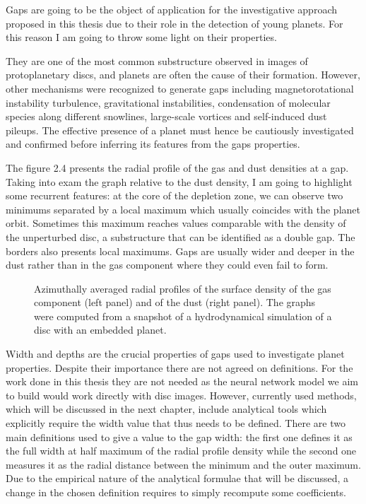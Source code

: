 \documentclass[a4paper,10pt]{report}
\begin{document}
Gaps are going to be the object of application for the investigative approach proposed in this thesis due
to their role in the detection of young planets.
For this reason I am going to throw some light on their properties.

They are one of the most common substructure observed in images of protoplanetary discs, and
planets are often the cause of their formation. However, other mechanisms were recognized to generate gaps
including magnetorotational instability turbulence, gravitational instabilities, condensation of molecular species along different snowlines,
large-scale vortices and self-induced dust pileups. The effective presence of a planet must hence be cautiously investigated and confirmed 
before inferring its features from the gaps properties. 

The figure 2.4 presents the radial profile of the gas and dust densities at a gap. Taking into exam 
the graph relative to the dust density, I am going to highlight some recurrent features:
at the core of the depletion zone, we can observe two minimums separated by a local maximum which usually coincides with the planet orbit.
Sometimes this maximum reaches values comparable with the density of the unperturbed disc, a substructure that can be identified as a double gap. 
The borders also presents local maximums. Gaps are usually wider and deeper in the dust rather than in the gas component where they could even
fail to form.

\begin{figure}
    \begin{center}
        
    \end{center}
    \caption{Azimuthally averaged radial profiles of the surface density of the gas component (left panel)
    and of the dust (right panel). The graphs were computed from a snapshot of a hydrodynamical
    simulation of a disc with an embedded planet.}
\end{figure}

Width and depths are the crucial properties of gaps used to investigate planet properties. Despite their importance there are not agreed on definitions.
For the work done in this thesis they are not needed as the neural network model we aim to build would work directly with disc images.
However, currently used methods, which will be discussed in the next chapter, include analytical tools which explicitly require the width
value that thus needs to be defined.
There are two main definitions used to give a value to the gap width: the first one defines it as the full width at half maximum of the radial profile density while
the second one measures it as the radial distance between the minimum and the outer maximum.
Due to the empirical nature of the analytical formulae that will be discussed, a change in the chosen definition requires to simply recompute
some coefficients.                                        
\end{document}

